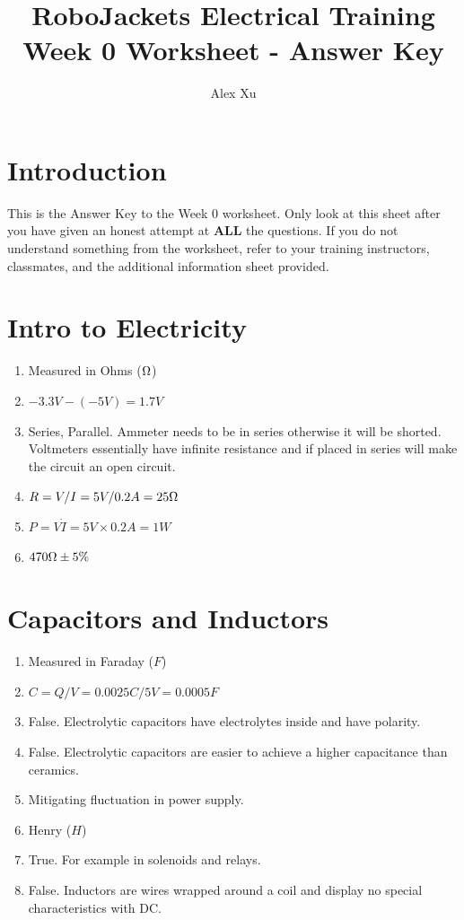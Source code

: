 \documentclass{article}
\title{RoboJackets Electrical Training Week 0 Worksheet - Answer Key}
\author{Alex Xu}
\begin{document}
\maketitle{}
\setcounter{tocdepth}{2}
\tableofcontents


\pagebreak

\section{Introduction}
This is the Answer Key to the Week 0 worksheet. Only look at this sheet after you have given an honest attempt at \textbf{ALL} the questions. If you do not understand something from the worksheet, refer to your training instructors, classmates, and the additional information sheet provided.

\section{Intro to Electricity}
\begin{enumerate}
	\item Measured in Ohms ($\ohm$)
	\item $-3.3V-(-5V)=1.7V$
	\item Series, Parallel. Ammeter needs to be in series otherwise it will be shorted. Voltmeters essentially have infinite resistance and if placed in series will make the circuit an open circuit.
	\item $R=V/I=5V/0.2A=25\ohm$
	\item $P=V\dot I = 5V \times 0.2 A = 1W$
	\item $470\ohm \pm 5\%$
\end{enumerate}

\section{Capacitors and Inductors}
\begin{enumerate}
	\item Measured in Faraday ($F$)
	\item $C=Q/V=0.0025C/5V=0.0005F$
	\item False. Electrolytic capacitors have electrolytes inside and have polarity.
	\item False. Electrolytic capacitors are easier to achieve a higher capacitance than ceramics.
	\item Mitigating fluctuation in power supply.
	\item Henry ($H$)
	\item True. For example in solenoids and relays.
	\item False. Inductors are wires wrapped around a coil and display no special characteristics with DC.
\end{enumerate}
\end{document}
